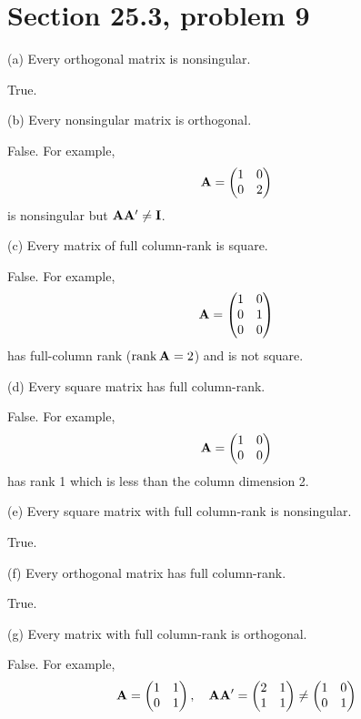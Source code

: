 \section{Section 25.3, problem 9}
(a) Every orthogonal matrix is nonsingular.

\bigskip
\noindent
True.

\bigskip
\noindent
(b) Every nonsingular matrix is orthogonal.

\bigskip
\noindent
False. For example,
$${\bf A}=\left(\begin{matrix}
1 & 0\cr
0 & 2
\end{matrix}\right)
$$
is nonsingular but ${\bf A}{\bf A}'\ne{\bf I}$.

\bigskip
\noindent
(c) Every matrix of full column-rank is square.

\bigskip
\noindent
False. For example,
$${\bf A}=\left(\begin{matrix}
1 & 0\cr
0 & 1\cr
0 & 0
\end{matrix}\right)$$
has full-column rank ($\mathop{\rm rank}{\bf A}=2$) and is not square.

\bigskip
\noindent
(d) Every square matrix has full column-rank.

\bigskip
\noindent
False. For example,
$${\bf A}=\left(\begin{matrix}
1 & 0\cr
0 & 0
\end{matrix}\right)
$$
has rank 1 which is less than the column dimension 2.

\bigskip
\noindent
(e) Every square matrix with full column-rank is nonsingular.

\bigskip
\noindent
True.

\bigskip
\noindent
(f) Every orthogonal matrix has full column-rank.

\bigskip
\noindent
True.

\bigskip
\noindent
(g) Every matrix with full column-rank is orthogonal.

\bigskip
\noindent
False. For example,
$${\bf A}=\left(\begin{matrix}1 & 1\cr0 & 1\end{matrix}\right),\quad
{\bf AA}'=\left(\begin{matrix}2 & 1\cr1 & 1\end{matrix}\right)\ne
\left(\begin{matrix}1 & 0\cr0 & 1\end{matrix}\right)
$$

